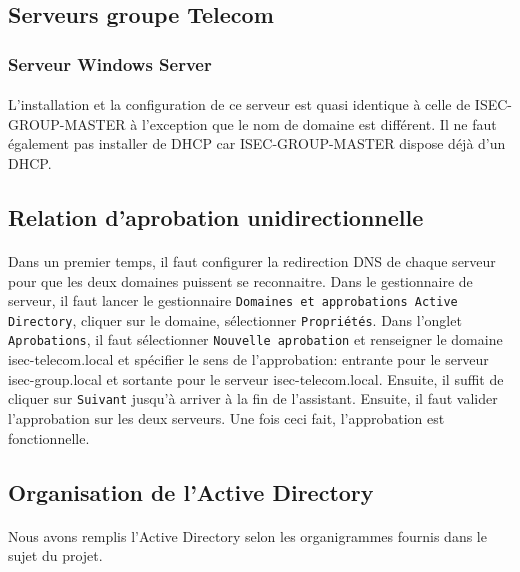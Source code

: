 	\subsection{Serveurs groupe Telecom}
		\subsubsection{Serveur Windows Server}
			\paragraph{}
				L’installation et la configuration de ce serveur est quasi identique à celle de ISEC-GROUP-MASTER à l’exception que le nom de domaine est différent. Il ne faut également pas installer de DHCP car ISEC-GROUP-MASTER dispose déjà d’un DHCP.

	\subsection{Relation d'aprobation unidirectionnelle}
		\paragraph{}
		Dans un premier temps, il faut configurer la redirection DNS de chaque serveur pour que les deux domaines puissent se reconnaitre.
		Dans le gestionnaire de serveur, il faut lancer le gestionnaire \texttt{Domaines et approbations Active Directory}, cliquer sur le domaine, sélectionner \texttt{Propriétés}. Dans l'onglet \texttt{Aprobations}, il faut sélectionner \texttt{Nouvelle aprobation} et renseigner le domaine isec-telecom.local et spécifier le sens de l'approbation: entrante pour le serveur isec-group.local et sortante pour le serveur isec-telecom.local. Ensuite, il suffit de cliquer sur \texttt{Suivant} jusqu'à arriver à la fin de l'assistant. Ensuite, il faut valider l'approbation sur les deux serveurs. Une fois ceci fait, l'approbation est fonctionnelle.

	\subsection{Organisation de l'Active Directory}	
		\paragraph{}
			Nous avons remplis l'Active Directory selon les organigrammes fournis dans le sujet du projet. 

